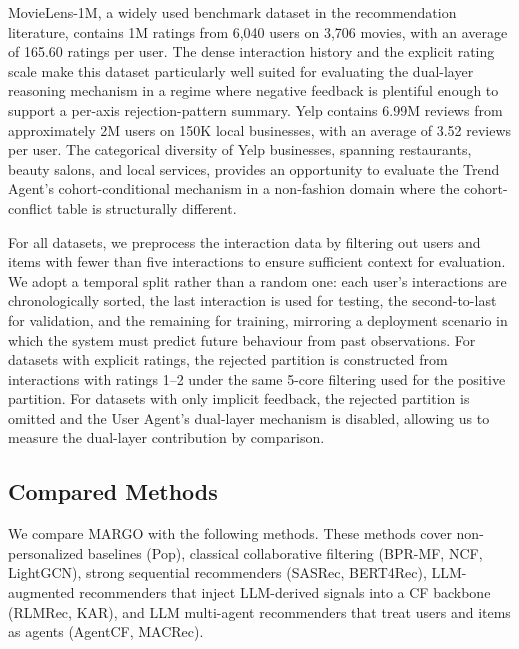 \documentclass[master,english,final]{postech-ucs}
\begin{document}
MovieLens-1M, a widely used benchmark dataset in the recommendation literature, contains 1M ratings from 6,040 users on 3,706 movies, with an average of 165.60 ratings per user.
The dense interaction history and the explicit rating scale make this dataset particularly well suited for evaluating the dual-layer reasoning mechanism in a regime where negative feedback is plentiful enough to support a per-axis rejection-pattern summary.
Yelp contains 6.99M reviews from approximately 2M users on 150K local businesses, with an average of 3.52 reviews per user.
The categorical diversity of Yelp businesses, spanning restaurants, beauty salons, and local services, provides an opportunity to evaluate the Trend Agent's cohort-conditional mechanism in a non-fashion domain where the cohort-conflict table is structurally different.

For all datasets, we preprocess the interaction data by filtering out users and items with fewer than five interactions to ensure sufficient context for evaluation.
We adopt a temporal split rather than a random one: each user's interactions are chronologically sorted, the last interaction is used for testing, the second-to-last for validation, and the remaining for training, mirroring a deployment scenario in which the system must predict future behaviour from past observations.
For datasets with explicit ratings, the rejected partition is constructed from interactions with ratings 1--2 under the same 5-core filtering used for the positive partition.
For datasets with only implicit feedback, the rejected partition is omitted and the User Agent's dual-layer mechanism is disabled, allowing us to measure the dual-layer contribution by comparison.


\subsection{Compared Methods}
We compare MARGO with the following methods.
These methods cover non-personalized baselines (Pop), classical collaborative filtering (BPR-MF, NCF, LightGCN), strong sequential recommenders (SASRec, BERT4Rec), LLM-augmented recommenders that inject LLM-derived signals into a CF backbone (RLMRec, KAR), and LLM multi-agent recommenders that treat users and items as agents (AgentCF, MACRec).
\end{document}
